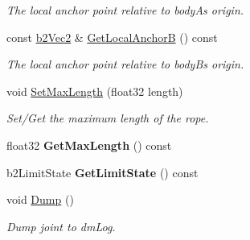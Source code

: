 \begin{DoxyCompactItemize}
\begin{DoxyCompactList}\small\item\em The local anchor point relative to bodyA\textquotesingle{}s origin. \end{DoxyCompactList}\item 
const \hyperlink{structb2_vec2}{b2\+Vec2} \& \hyperlink{classb2_rope_joint_a511b297fbebfbecdcdce68e1cffa272c}{Get\+Local\+AnchorB} () const \hypertarget{classb2_rope_joint_a511b297fbebfbecdcdce68e1cffa272c}{}\label{classb2_rope_joint_a511b297fbebfbecdcdce68e1cffa272c}

\begin{DoxyCompactList}\small\item\em The local anchor point relative to bodyB\textquotesingle{}s origin. \end{DoxyCompactList}\item 
void \hyperlink{classb2_rope_joint_a92cea201d21acd2f2a7cc9b00e165848}{Set\+Max\+Length} (float32 length)\hypertarget{classb2_rope_joint_a92cea201d21acd2f2a7cc9b00e165848}{}\label{classb2_rope_joint_a92cea201d21acd2f2a7cc9b00e165848}

\begin{DoxyCompactList}\small\item\em Set/\+Get the maximum length of the rope. \end{DoxyCompactList}\item 
float32 {\bfseries Get\+Max\+Length} () const \hypertarget{classb2_rope_joint_a2bee2d2f47a27ab900438ec58d86f9ac}{}\label{classb2_rope_joint_a2bee2d2f47a27ab900438ec58d86f9ac}

\item 
b2\+Limit\+State {\bfseries Get\+Limit\+State} () const \hypertarget{classb2_rope_joint_af3653f62379529a43a99e6a8e84f5d43}{}\label{classb2_rope_joint_af3653f62379529a43a99e6a8e84f5d43}

\item 
void \hyperlink{classb2_rope_joint_a4612dca9851a66701893a48d896dbd14}{Dump} ()\hypertarget{classb2_rope_joint_a4612dca9851a66701893a48d896dbd14}{}\label{classb2_rope_joint_a4612dca9851a66701893a48d896dbd14}

\begin{DoxyCompactList}\small\item\em Dump joint to dm\+Log. \end{DoxyCompactList}\end{DoxyCompactItemize}
